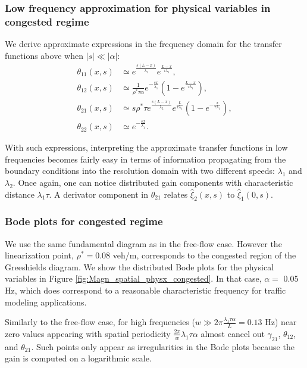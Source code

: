 \documentclass[a4paper, 10pt, conference]{ieeeconf}      %
\begin{document}
\subsubsection{Low frequency approximation for physical variables in congested regime}
We derive approximate expressions in the frequency domain for the transfer functions above when $\left|s\right|\ll\left|\alpha\right|$:
{\footnotesize
\begin{subequations}
\begin{align}
\theta_{11}\left(x,s\right) &\simeq
e^{\frac{s\left(L-x\right)}{\lambda_{2}}}
e^{\frac{L-x}{\tau\lambda_{1}}},\\
\theta_{12}\left(x,s\right) &\simeq
\frac{1}{\rho^{*}\tau\alpha}
e^{-\frac{sx}{\lambda_{1}}}
\left(
	1 - e^{\frac{L-x}{\tau\lambda_{1}}}
\right),\\
\theta_{21}\left(x,s\right) &\simeq
s \rho^{*}\tau
e^{\frac{s\left(L-x\right)}{\lambda_{2}}}
e^{\frac{L}{\tau\lambda_{1}}}
\left(
	1 - e^{-\frac{x}{\tau\lambda_{1}}}
\right),\\
\theta_{22}\left(x,s\right) &\simeq
e^{-\frac{sx}{\lambda_{1}}}.
\end{align}
\end{subequations}
}

With such expressions, interpreting the approximate transfer functions in low frequencies becomes fairly easy in terms of information propagating from the boundary conditions into the resolution domain with two different speeds: $\lambda_1$ and $\lambda_2$. Once again, one can notice distributed gain components with characteristic distance $\lambda_1 \tau$. A derivator component in $\theta_{21}$ relates $\hat{\xi}_2(x,s)$ to $\hat{\xi}_1(0,s)$.\\

\subsubsection{Bode plots for congested regime}
We use the same fundamental diagram as in the free-flow case. However the linearization point, $\rho^* = 0.08$ veh/m, corresponds to the congested region of the Greeshields diagram. We show the distributed Bode plots for the physical variables in Figure \ref{fig:Magn_spatial_physx_congested}. In that case, $\alpha =$ 0.05 Hz, which does correspond to a reasonable characteristic frequency for traffic modeling applications.

Similarly to the free-flow case, for high frequencies ($w \gg 2 \pi \frac{\lambda_{1} \tau \alpha}{L} = 0.13$ Hz) near zero values appearing with spatial periodicity $\frac{2 \pi}{w} \lambda_{1} \tau \alpha$ almost cancel out $\gamma_{21}$, $\theta_{12}$, and $\theta_{21}$. Such points only appear as irregularities in the Bode plots because the gain is computed on a logarithmic scale.\\
\end{document}
